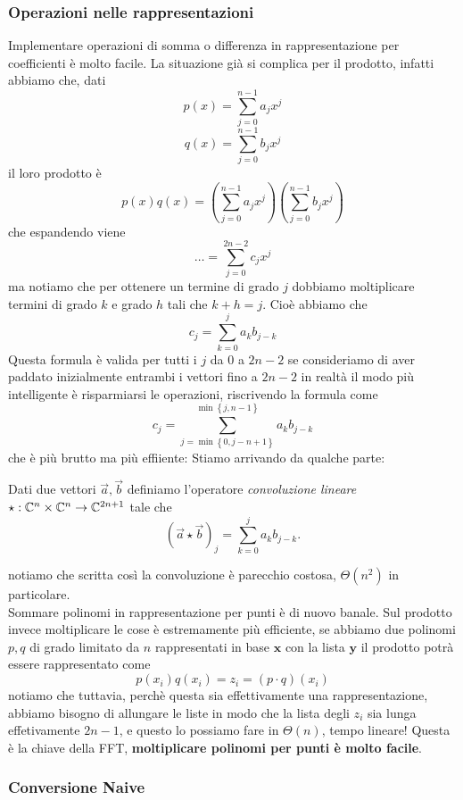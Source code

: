 \documentclass[11pt]{scrartcl}
\newcommand{\bigtheta}[1]{\Theta\!\left(#1\right)}
\begin{document}
	\subsubsection{Operazioni nelle rappresentazioni}
	
	Implementare operazioni di somma o differenza in rappresentazione per coefficienti è molto facile. La situazione già si complica per il prodotto, infatti abbiamo che, dati 
	$$p(x)=\sum_{j=0}^{n-1}a_jx^j$$
	$$q(x)=\sum_{j=0}^{n-1}b_jx^j$$
	il loro prodotto è
	$$p(x)q(x)=\left(\sum_{j=0}^{n-1}a_jx^j\right)\left(\sum_{j=0}^{n-1}b_jx^j\right)$$
	che espandendo viene
	$$\dots=\sum_{j=0}^{2n-2}c_jx^j$$
	ma notiamo che per ottenere un termine di grado $j$ dobbiamo moltiplicare termini di grado $k$ e grado $h$ tali che $k+h=j$. Cioè abbiamo che
	$$c_j=\sum_{k=0}^{j}a_kb_{j-k}$$
	Questa formula è valida per tutti i $j$ da $0$ a $2n-2$ se consideriamo di aver paddato inizialmente entrambi i vettori fino a $2n-2$ in realtà il modo più intelligente è risparmiarsi le operazioni, riscrivendo la formula come
	$$c_j=\sum_{j=\min\left\{0,j-n+1\right\}}^{\min\left\{j,n-1\right\}}a_kb_{j-k}$$
	che è più brutto ma più effiiente:
	Stiamo arrivando da qualche parte:
	\begin{definition}[Convoluzione]
		Dati due vettori $\vec{a},\vec{b}$ definiamo l'operatore \textit{convoluzione lineare} $\star:\mathbb C^n\times\mathbb C^n\to\mathbb C^{2n+1}$ tale che 
		$$\left(\vec{a}\star \vec{b}\right)_j=\sum_{k=0}^{j}a_{k}b_{j-k}.$$
	\end{definition}
	notiamo che scritta così la convoluzione è parecchio costosa, $\bigtheta{n^2}$ in particolare. \\
	Sommare polinomi in rappresentazione per punti è di nuovo banale. Sul prodotto invece moltiplicare le cose è estremamente più efficiente, se abbiamo due polinomi $p,q$ di grado limitato da $n$ rappresentati in base $\mathbf{x}$ con la lista $\mathbf{y}$ il prodotto potrà essere rappresentato come
	$$p(x_i)q(x_i)=z_i=(p\cdot q)(x_i)$$
	notiamo che tuttavia, perchè questa sia effettivamente una rappresentazione, abbiamo bisogno di allungare le liste in modo che la lista degli $z_i$ sia lunga effetivamente $2n-1$, e questo lo possiamo fare in $\bigtheta{n}$, tempo lineare! Questa è la chiave della FFT, \textbf{moltiplicare polinomi per punti è molto facile}.
	\subsubsection{Conversione Naive}
	
\end{document}
